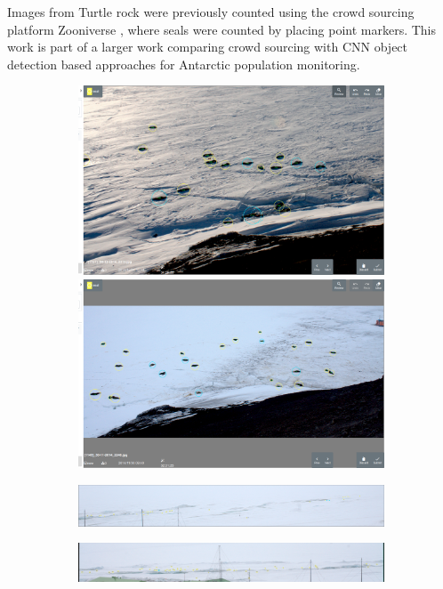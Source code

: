 Images from Turtle rock were previously counted using the crowd sourcing platform Zooniverse \cite{Zooniverse}, where seals were counted by placing point markers. This work is part of a larger work comparing crowd sourcing with \gls{CNN} object detection based approaches for Antarctic population monitoring.

\begin{figure}[h!]
\centering
\begin{subfigure}[t]{1.0\linewidth}
  \includegraphics[width=0.475\linewidth]{figures/annotation/screenshots/seals_small2.png}
  \hfill
  \includegraphics[width=0.475\linewidth]{figures/annotation/screenshots/seals_small.png}
  \caption{}
\end{subfigure}

\begin{subfigure}[t]{1.0\linewidth}
  \includegraphics[width=1.0\linewidth]{figures/annotation/screenshots/cam_c.png}
\end{subfigure}

\begin{subfigure}[t]{1.0\linewidth}
  \includegraphics[width=1.0\linewidth]{figures/annotation/screenshots/cam_b.png}
  \caption{}
\end{subfigure}


\end{figure}
